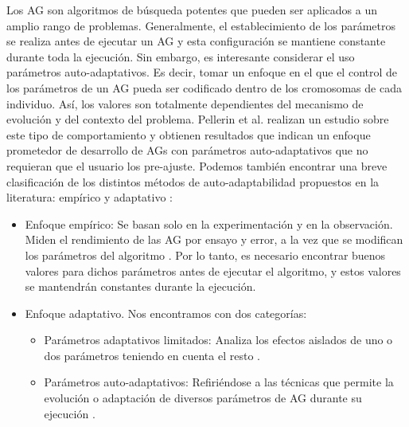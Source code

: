 Los AG son algoritmos de búsqueda potentes que pueden ser aplicados a un amplio rango de problemas. 
Generalmente, el establecimiento de los parámetros se realiza antes de ejecutar un AG y esta configuración se mantiene constante durante toda la ejecución. 
Sin embargo, es interesante considerar el uso parámetros auto-adaptativos. 
Es decir, tomar un enfoque en el que el control de los parámetros de un AG pueda ser codificado dentro de los cromosomas de cada individuo. 
Así, los valores son totalmente dependientes del mecanismo de evolución y del contexto del problema. 
Pellerin et al. \parencite{pellerinSelfadaptiveParametersGenetic2004} realizan  un estudio sobre este tipo de comportamiento y obtienen resultados que indican un enfoque prometedor de desarrollo de AGs con parámetros auto-adaptativos que no requieran que el usuario los pre-ajuste. 
Podemos también encontrar una breve clasificación de los distintos métodos de auto-adaptabilidad propuestos en la literatura: empírico y adaptativo \parencite{eibenParameterControlEvolutionary1999} \parencite{loboOverviewParameterlessGenetic2008}: 
\begin{itemize}
	\item Enfoque empírico: Se basan solo en la experimentación y en la observación. 
	Miden el rendimiento de las AG por ensayo y error, a la vez que se modifican los parámetros del algoritmo \parencite{eibenParameterControlEvolutionary1999}. 
	Por lo tanto, es necesario encontrar buenos valores para dichos parámetros antes de ejecutar el algoritmo, y estos valores se mantendrán constantes durante la ejecución. 
	\item Enfoque adaptativo. 
	Nos encontramos con dos categorías:
	\begin{itemize}
		\item Parámetros adaptativos limitados: Analiza los efectos aislados de uno o dos parámetros teniendo en cuenta el resto \parencite{lisParallelGeneticAlgorithm1996}. 
		\item Parámetros auto-adaptativos: Refiriéndose a las técnicas que permite la evolución o adaptación de diversos parámetros de AG durante su ejecución \parencite{grefenstetteOptimizationControlParameters1986} \parencite{phamCompetitiveEvolutionNatural1994}.
	\end{itemize}
\end{itemize}

